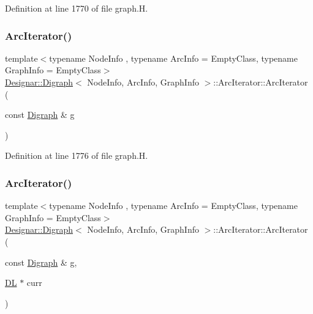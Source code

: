 Definition at line 1770 of file graph.\+H.

\mbox{\label{class_designar_1_1_digraph_1_1_arc_iterator_ac16db42766a60aa488fb4db5492c1361}} 
\subsubsection{\texorpdfstring{Arc\+Iterator()}{ArcIterator()}\hspace{0.1cm}{\footnotesize\ttfamily [2/5]}}
{\footnotesize\ttfamily template$<$typename Node\+Info , typename Arc\+Info  = Empty\+Class, typename Graph\+Info  = Empty\+Class$>$ \\
\hyperlink{class_designar_1_1_digraph}{Designar\+::\+Digraph}$<$ Node\+Info, Arc\+Info, Graph\+Info $>$\+::Arc\+Iterator\+::\+Arc\+Iterator (\begin{DoxyParamCaption}\item[{const \hyperlink{class_designar_1_1_digraph}{Digraph} \&}]{g }\end{DoxyParamCaption})\hspace{0.3cm}{\ttfamily [inline]}}



Definition at line 1776 of file graph.\+H.

\mbox{\label{class_designar_1_1_digraph_1_1_arc_iterator_ae4a8b9172d19134e71693734003ee350}} 
\subsubsection{\texorpdfstring{Arc\+Iterator()}{ArcIterator()}\hspace{0.1cm}{\footnotesize\ttfamily [3/5]}}
{\footnotesize\ttfamily template$<$typename Node\+Info , typename Arc\+Info  = Empty\+Class, typename Graph\+Info  = Empty\+Class$>$ \\
\hyperlink{class_designar_1_1_digraph}{Designar\+::\+Digraph}$<$ Node\+Info, Arc\+Info, Graph\+Info $>$\+::Arc\+Iterator\+::\+Arc\+Iterator (\begin{DoxyParamCaption}\item[{const \hyperlink{class_designar_1_1_digraph}{Digraph} \&}]{g,  }\item[{\hyperlink{class_designar_1_1_d_l}{DL} $\ast$}]{curr }\end{DoxyParamCaption})\hspace{0.3cm}{\ttfamily [inline]}}



